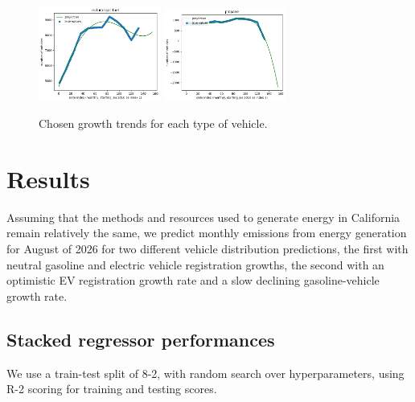 \documentclass{article}
\begin{document}
\begin{figure}
\begin{center}
    \includegraphics[width=4cm]{imgs/nat_gas_proj.png}
    \includegraphics[width=4cm]{imgs/propane_proj.png}
    \caption{\label{registrationprojections} Chosen growth trends for each type of vehicle.}
    \end{center}
\end{figure}


\section{Results}

Assuming that the methods and resources used to  generate energy in California remain relatively the same, we predict monthly emissions from energy generation for August of 2026 for two different vehicle distribution predictions, the first with neutral gasoline and electric vehicle registration growths, the second with an optimistic EV registration growth rate and a slow declining gasoline-vehicle growth rate.

\subsection{Stacked regressor performances}

We use a train-test split of 8-2, with random search over hyperparameters, using R-2 scoring for training and testing scores.
\end{document}
